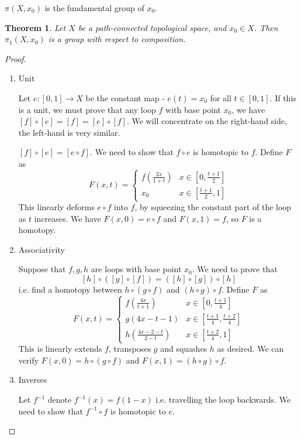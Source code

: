 \documentclass{article}
\theoremstyle{definition}
\theoremstyle{plain}%
\newtheorem{thm}{Theorem}[section]
\theoremstyle{remark}
\begin{document}
$\pi(X, x_0)$ is the fundamental group of $x_0$.

\begin{thm}
    Let $X$ be a path-connected topological space, and $x_0 \in X$. Then $\pi_1(X, x_0)$ is a group with respect to composition.
\end{thm}

\begin{proof}
     \begin{enumerate}
         \item Unit
         
         Let $e : [0,1] \to X$ be the constant map - $e(t) = x_0$ for all $t \in [0,1]$. If this is a unit, we must prove that any loop $f$ with base point $x_0$, we have $[f] \circ [e] = [f] = [e] \circ [f]$. We will concentrate on the right-hand side, the left-hand is very similar.
         
         $[f] \circ [e] = [e \circ f]$. We need to show that $f \circ e$ is homotopic to $f$. Define $F$ as
         \[F(x,t) = \begin{cases} f(\frac{2x}{1+t}) &x\in[0,\frac{t+1}{2}] \\ x_0 &x \in [\frac{t+1}{2}, 1]\end{cases}\]
         This linearly deforms $e \circ f$ into $f$, by squeezing the constant part of the loop as $t$ increases. We have $F(x,0) = e \circ f$ and $F(x,1) = f$, so $F$ is a homotopy.
         \item Associativity
         
         Suppose that $f,g,h$ are loops with base point $x_0$. We need to prove that
         \[[h] \circ([g]\circ [f]) = ([h] \circ [g]) \circ [h]\]
         i.e. find a homotopy between $h \circ (g \circ f)$ and $(h \circ g) \circ f$.
         Define $F$ as
         \[F(x,t) = \begin{cases} 
            f(\frac{4x}{t+1}) &x \in [0, \frac{t+1}{4}] \\
            g(4x - t - 1)    &x \in [\frac{t+1}{4}, \frac{t+2}{4}] \\
            h(\frac{4x - 2 -t}{2-t}) &x \in [\frac{t+2}{4}, 1]
         \end{cases}\]
         This is linearly extends $f$, transposes $g$ and squashes $h$ as desired. We can verify $F(x,0) = h \circ (g \circ f)$ and $F(x,1) = (h \circ g) \circ f$.
         \item Inverses
         
         Let $f^{-1}$ denote $f^{-1}(x) = f(1-x)$ i.e. travelling the loop backwards. We need to show that $f^{-1} \circ f$ is homotopic to $e$.
         

\end{enumerate}
\end{proof}
\end{document}
